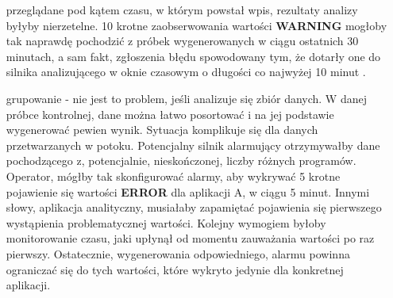 \begin{itemize}
        przeglądane pod kątem czasu, w którym powstał wpis, rezultaty analizy byłyby nierzetelne. 10 krotne zaobserwowania wartości \textbf{WARNING} mogłoby tak naprawdę
        pochodzić z próbek wygenerowanych w ciągu ostatnich 30 minutach, a sam fakt, zgłoszenia błędu spowodowany tym, że dotarły one do silnika analizującego
        w oknie czasowym o długości co najwyżej 10 minut \cite{8_requirements_of_real_time_processing}.
        \item[grupowanie] - nie jest to problem, jeśli analizuje się zbiór danych. W danej próbce kontrolnej, dane można łatwo posortować i na jej podstawie 
        wygenerować pewien wynik. Sytuacja komplikuje się dla danych przetwarzanych w potoku. Potencjalny silnik alarmujący otrzymywałby dane pochodzącego z,
        potencjalnie, nieskończonej, liczby różnych programów. Operator, mógłby tak skonfigurować alarmy, aby wykrywać 5 krotne pojawienie się wartości \textbf{ERROR}
        dla aplikacji A, w ciągu 5 minut. Innymi słowy, aplikacja analityczny, musiałaby zapamiętać pojawienia się pierwszego wystąpienia problematycznej wartości.
        Kolejny wymogiem byłoby monitorowanie czasu, jaki upłynął od momentu zauważania wartości po raz pierwszy. Ostatecznie, wygenerowania odpowiedniego,
        alarmu powinna ograniczać się do tych wartości, które wykryto jedynie dla konkretnej aplikacji.
    \end{itemize}
    
